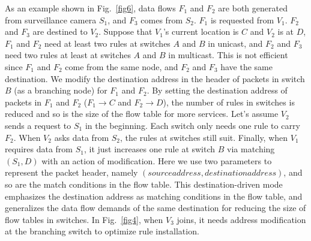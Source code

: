 \documentclass[journal]{IEEEtran}
\begin{document}
As an example shown in Fig.~\ref{fig6}, data flows $F_{1}$ and $F_{2}$ are both generated from surveillance camera $S_{1}$, and $F_{3}$ comes from $S_{2}$. $F_{1}$ is requested from $V_{1}$. $F_{2}$ and $F_{3}$ are destined to $V_{2}$. Suppose that $V_{1}$'s current location is $C$ and $V_{2}$ is at $D$, $F_{1}$ and $F_{2}$ need at least two rules at switches $A$ and $B$ in unicast, and $F_{2}$ and $F_{3}$ need two rules at least at switches $A$ and $B$ in multicast. This is not efficient since $F_{1}$ and $F_{2}$ come from the same node, and $F_{2}$ and $F_{3}$ have the same destination. We modify the destination address in the header of packets in switch $B$ (as a branching node) for $F_{1}$ and $F_{2}$. By setting the destination address of packets in $F_{1}$ and $F_{2}$ ($F_{1} \to C$ and $F_{2} \to D$), the number of rules in switches is reduced and so is the size of the flow table for more services. Let's assume $V_{2}$ sends a request to $S_{1}$ in the beginning. Each switch only needs one rule to carry $F_{2}$. When $V_{2}$ asks data from $S_{2}$, the rules at switches still suit. Finally, when $V_{1}$ requires data from $S_{1}$, it just increases one rule at switch $B$ via matching $(S_{1}, D)$ with an action of modification. Here we use two parameters to represent the packet header, namely $(source address, destination address)$, and so are the match conditions in the flow table. This destination-driven mode emphasizes the destination address as matching conditions in the flow table, and generalizes the data flow demands of the same destination for reducing the size of flow tables in switches. In Fig.~\ref{fig4}, when $V_{3}$ joins, it needs address modification at the branching switch to optimize rule installation.
\end{document}
